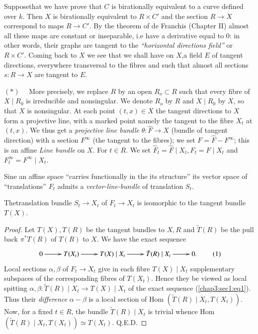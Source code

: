 Suppose\pageoriginale that we have prove that $C$ is birationally equivalent to a
curve defined over $k$. Then $X$ is birationally equivalent to $R\times
C'$ and the section $R \rightarrow X$ correspond to maps $R\rightarrow
C'$.  By the theorem of de Franchis (Chapter II) almost all these
maps are constant  or inseparable, i.e have a derivative equal to 0:
in other words, their graphs are tangent to the \textit{``horizontal
  directions field''} or $R\times C'$. Coming back to $X$ we see that
we shall have on $X$,a field  $E$ of tangent  directions,  everywhere
transversal  to the fibres and such that almost all sections $s:
R\rightarrow X$ are tangent to $E$. 

\medskip
\noindent 
$(\ast)$~~ More precisely, we replace $R$ by an open $R_o\subset R$
such that every fibre of $X\mid R_0$ is irreducible and nonsingular. We
denote $R_o$ by $R$ and $X \mid R_0$ by $X$, so that $X$ is
nonsingular. At each point $(t,x) \in   X$ the tangent  directions to
$X$ form a projective line, with a marked point  namely the tangent
to the fibre $X_t$ at $(t,x)$. We thus get a \textit{projective line
  bundle} $\theta:\hat{F}\rightarrow X$ (bundle of tangent direction)
with a section $F^\infty$ (the tangent to the fibres); we set
$F=\hat{F} -F^\infty$; this  is an affine \textit{Line
  bundle} on $X$. For $t \in   R$. We set $\hat{F}_t =\hat{F}\mid X_t,
F_t=F\mid X_t$ and $F^\infty_t=F^\infty \mid X_t$. 

Sine an affine space ``carries functionally in the its structure'' its vector
space of ``translations''  $F_t$ admits a \textit{vector-line-bundle}
of translation $S_t$. 

\begin{lemma}\label{chap3:sec1:lem2}%
  The\pageoriginale translation bundle $S_t\rightarrow X_t$ of $F_t\rightarrow X_t$
  is isomorphic to the tangent bundle $T(X)$. 
\end{lemma}

\begin{proof}%
  Let $T(X), T(R)$ be the tangent bundles to $X,R$ and $\tilde{T}(R)$
  be the pull back $\pi^\ast T(R)$ of $T(R)$ to $X$. We have the exact
  sequence  
  \[
  \xymatrix{
    0\ar[r] & T(X_t)\ar[r] & T(X)\mid X_t \ar[r] & \tilde{T}(R)\mid X_t
    \ar[r] & 0. 
  }\tag{1}\label{chap3:sec1:eq1}
  \]
  Local sections $\alpha ,\beta$ of $F_t\rightarrow X_t$ give in each
  fibre $T(X)\mid X_t$ supplementary subspaces of the corresponding
  fibres  of $T(X_t)$. Hence they  be viewed as local  spitting
  $\alpha  , \beta :\tilde{T}(R)\mid X_t\rightarrow T(X)\mid X_t$ of
  the exact sequence (\ref{chap3:sec1:eq1}). Thus their \textit{difference}
  $\alpha -\beta $ is a local section of Hom $(\tilde{T}(R)\mid X_t,
  T(X_t))$. Now, for a fixed $t \in   R$, the bundle
  $\tilde{T}(R)\mid X_t$ is trivial whence Hom $(\tilde{T}(R)\mid X_t,
  T(X_t))\simeq T(X_t)$. \phantom{WWWWWWWWWWWW}\hfill{Q.E.D.}
\end{proof}

